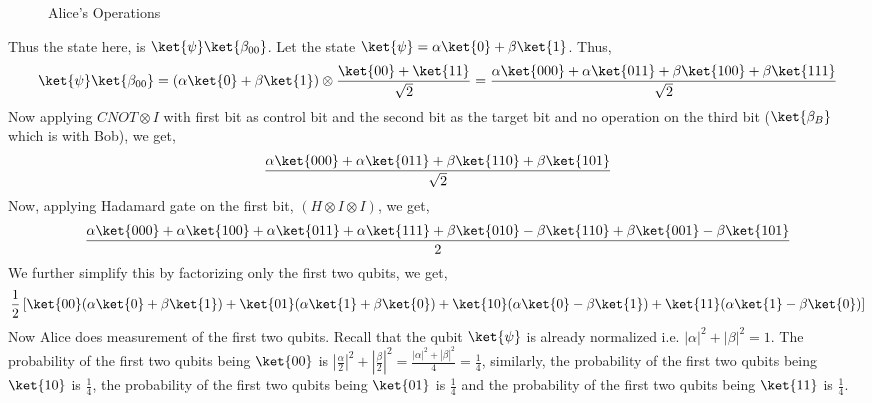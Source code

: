 \documentclass[12pt, oneside]{book}
\theoremstyle{definition}
\theoremstyle{definition}
\theoremstyle{remark}
\begin{document}
\begin{enumerate}
\begin{figure}
        \caption{Alice's Operations}
        \label{fig:teleportation2}
    \end{figure}
    Thus the state here, is $\ket{\psi}\ket{\beta_{00}}$. Let the state $\ket{\psi}=\alpha\ket{0}+\beta\ket{1}$.
    Thus, 
    \[
        \ket{\psi}\ket{\beta_{00}}=(\alpha\ket{0}+\beta\ket{1})\otimes \frac{\ket{00}+\ket{11}}{\sqrt{2}}=\frac{\alpha\ket{000}+\alpha\ket{011}+\beta\ket{100}+\beta\ket{111}}{\sqrt{2}}
    \]
    Now applying $CNOT \otimes I$ with first bit as control bit and the second bit as the target bit and no operation on the third bit ($\ket{\beta_B}$ which is with Bob), we get,
    \[
        \frac{\alpha\ket{000}+\alpha\ket{011}+\beta\ket{110}+\beta\ket{101}}{\sqrt{2}}
    \]
    Now, applying Hadamard gate on the first bit, $(H\otimes I\otimes I)$, we get,
    \[
        \frac{\alpha\ket{000}+\alpha\ket{100}+\alpha\ket{011}+\alpha\ket{111}+\beta\ket{010}-\beta\ket{110}+\beta\ket{001}-\beta\ket{101}}{2}
    \]
    We further simplify this by factorizing only the first two qubits, we get,
    \[
        \frac{1}{2}\left[\ket{00}(\alpha\ket{0}+\beta\ket{1})+\ket{01}(\alpha\ket{1}+\beta\ket{0})+\ket{10}(\alpha\ket{0}-\beta\ket{1})+\ket{11}(\alpha\ket{1}-\beta\ket{0})\right]
    \]
    Now Alice does measurement of the first two qubits. Recall that the qubit $\ket{\psi}$ is already normalized i.e. $|\alpha|^2+|\beta|^2=1$. The probability of the first two qubits being $\ket{00}$ is $|\frac{\alpha}{2}|^2+|\frac{\beta}{2}|^2=\frac{|\alpha|^2+|\beta|^2}{4}=\frac{1}{4}$, similarly, 
    the probability of the first two qubits being $\ket{10}$ is $\frac{1}{4}$, the probability of the first two qubits being $\ket{01}$ is $\frac{1}{4}$ and the probability of the first two qubits being $\ket{11}$ is $\frac{1}{4}$.


\end{enumerate}
\end{document}
